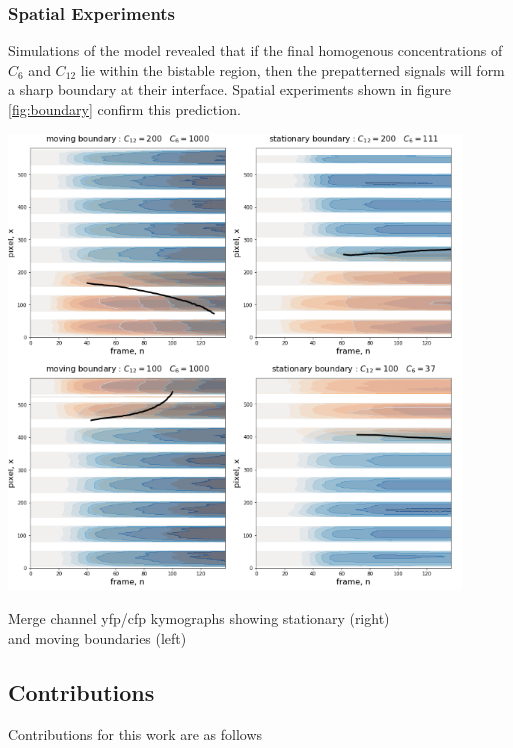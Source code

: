 \subsubsection{Spatial Experiments}
Simulations of the model revealed that if the final homogenous concentrations
of $C_6$ and $C_{12}$ lie within the bistable region, then the prepatterned
signals will form a sharp boundary at their interface. Spatial experiments
shown in figure \ref{fig:boundary} confirm this prediction.
\begin{Figure}
\includegraphics[width=120mm]{figures/spatial.png}
\caption{Merge channel yfp/cfp kymographs showing stationary (right)\\and moving boundaries (left)}
\label{fig:boundary}
\end{Figure}

\subsection{Contributions}
Contributions for this work are as follows

